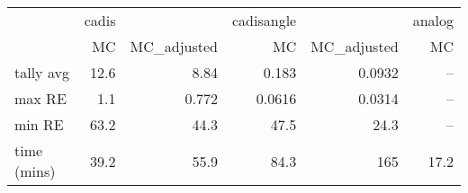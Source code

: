 \begin{tabular}{lrrrrr}
\toprule
{} & cadis &             & cadisangle &             & analog \\
{} &    MC & MC\_adjusted &         MC & MC\_adjusted &     MC \\
\midrule
tally avg   &  12.6 &        8.84 &      0.183 &      0.0932 &    -- \\
max RE      &   1.1 &       0.772 &     0.0616 &      0.0314 &    -- \\
min RE      &  63.2 &        44.3 &       47.5 &        24.3 &    -- \\
time (mins) &  39.2 &        55.9 &       84.3 &         165 &   17.2 \\
\bottomrule
\end{tabular}
